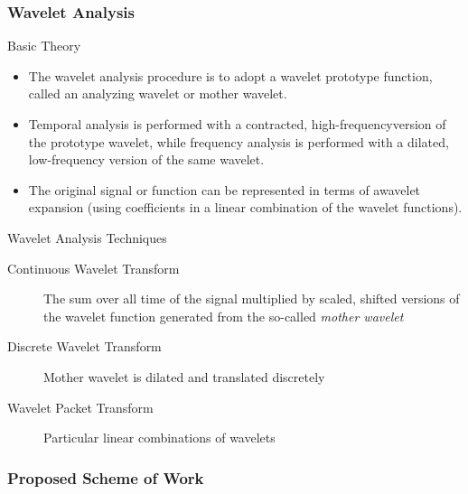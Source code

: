 \documentclass[10pt]{beamer}
\begin{document}
\begin{frame}
\frametitle{Wavelet Analysis}
\begin{block}{Basic Theory}
\begin{itemize}
          \item The wavelet analysis procedure is to adopt a wavelet prototype function, called an analyzing wavelet or mother wavelet.
          \item Temporal analysis is performed with a contracted, high-frequencyversion of the prototype wavelet, while frequency analysis is performed  with  a dilated, low-frequency version of the same wavelet.
          \item The original signal or function can be represented in terms of awavelet expansion (using coefficients in a linear combination of the wavelet functions).
\end{itemize}
\end{block}

\begin{block}{Wavelet Analysis Techniques}
\begin{description}
          \item[Continuous Wavelet Transform] The sum over all time of the signal multiplied by scaled, shifted versions of the wavelet function generated from the so-called \emph{mother wavelet}
          \item[Discrete Wavelet Transform] Mother wavelet is dilated and translated discretely
          \item[Wavelet Packet Transform] Particular linear combinations of wavelets
\end{description}
\end{block}
\end{frame}

\begin{frame}
\frametitle{Proposed Scheme of Work}
\end{frame}
\end{document}
